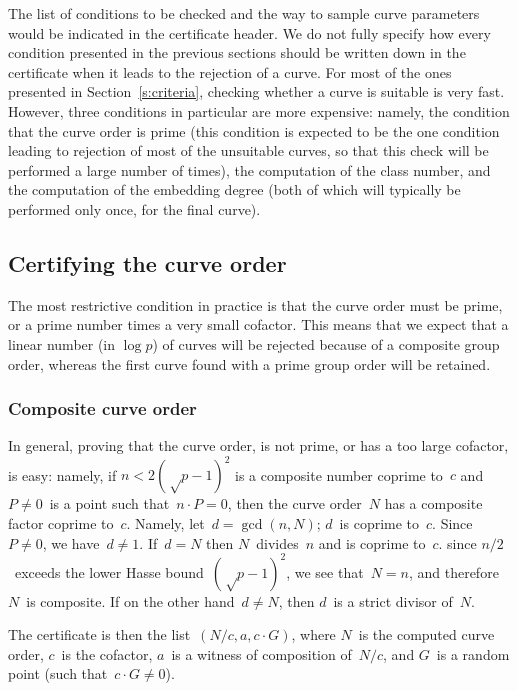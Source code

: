 \documentclass[twocolumn,letterpaper,10pt]{article}
\begin{document}
The list of conditions to be checked and the way to sample
curve parameters would be indicated in the certificate header.
We do not fully specify how every condition presented
in the previous sections should be written down in the
certificate when it leads to the rejection of a curve.
For most of the ones presented in Section~\ref{s:criteria},
checking whether a curve is suitable is very fast.
However, three conditions in particular are more expensive:
namely, the condition that the curve order is prime
(this condition is expected to be the one condition
leading to rejection of most of the unsuitable curves,
so that this check will be performed a large number of times),
the computation of the class number,
and the computation of the embedding degree
(both of which will typically be performed only once, for the final curve).

\subsection{Certifying the curve order}

The most restrictive condition in practice is that
the curve order must be prime, or a prime number
times a very small cofactor.
This means that we expect that a linear number (in $\log p$)
of curves will be rejected because of a composite group order,
whereas the first curve found with a prime group order
will be retained.

\subsubsection{Composite curve order}

In general, proving that the curve order,
is not prime, or has a too large cofactor, is easy:
namely, if $n < 2 (√p-1)^2$ is a composite number coprime to~$c$
and $P ≠ 0$~is a point such that~$n · P = 0$,
then the curve order~$N$ has a composite factor coprime to~$c$.
Namely, let~$d = \gcd (n, N)$; $d$~is coprime to~$c$.
Since~$P≠0$, we have~$d≠1$.
If~$d = N$ then $N$~divides~$n$ and is coprime to~$c$.
since $n/2$~exceeds the lower Hasse bound~$(√p-1)^2$,
we see that~$N = n$, and therefore $N$~is composite.
If on the other hand~$d ≠ N$, then $d$~is a strict divisor of~$N$.

The certificate is then the list~$(N/c, a, c · G)$,
where $N$~is the computed curve order, $c$~is the cofactor,
$a$~is a witness of composition of~$N/c$,
and $G$~is a random point (such that~$c · G ≠ 0$).

\smallskip
\end{document}
